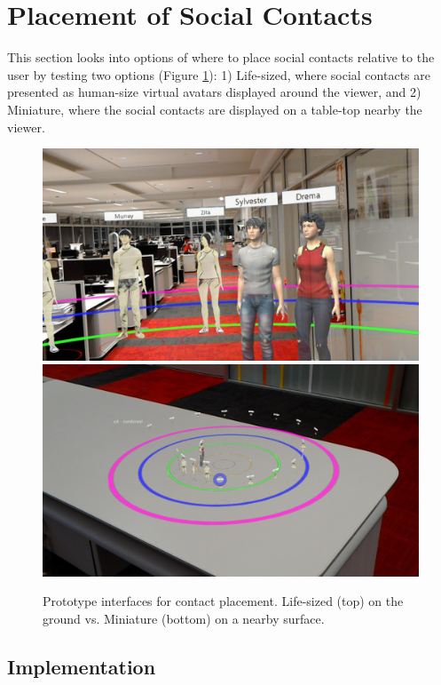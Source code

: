 \pagebreak
\section{Placement of Social Contacts}
\label{sec:contacts:placing}

This section looks into options of where to place social contacts relative to the user \cite{Nassani2017a} by testing two options (Figure \ref{fig:continuum:conditions}): 1) Life-sized, where social contacts are presented as human-size virtual avatars displayed around the viewer, and 2) Miniature, where the social contacts are displayed on a table-top nearby the viewer. 

\begin{figure}[ht]
    \centering
    \includegraphics[width=0.8\linewidth]{images/42-placement-ismar17/20170625_205203_HoloLens.jpg}    \includegraphics[width=0.8\linewidth]{images/42-placement-ismar17/20170625_205112_HoloLens.jpg}
    \caption{Prototype interfaces for contact placement. Life-sized (top) on the ground vs. Miniature (bottom) on a nearby surface.} 
    \label{fig:continuum:conditions}
\end{figure}

\subsection{Implementation}

